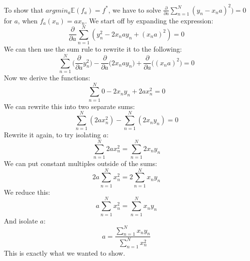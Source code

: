 To show that $argmin_a\mathbb{E}(f_a) = f^*$, we have to solve $\frac{\partial}{\partial a}\sum_{n=1}^N(y_n-x_na)^2)=0$ for $a$, when $f_a(x_n) = ax_n$. We start off by expanding the expression:
$$
\frac{\partial}{\partial a}\sum_{n=1}^N(y_n^2-2x_nay_n+(x_na)^2)=0
$$
We can then use the sum rule to rewrite it to the following:
$$
\sum_{n=1}^N\Big(\frac{\partial}{\partial a}y_n^2\Big) - \frac{\partial}{\partial a}\Big(2x_nay_n\Big)+\frac{\partial}{\partial a}\Big((x_na)^2\Big)=0
$$
Now we derive the functions:
$$
\sum_{n=1}^N0-2x_ny_n+2ax_n^2=0
$$
We can rewrite this into two separate sums:
$$
\sum_{n=1}^N (2ax_n^2) - \sum_{n=1}^N (2x_ny_n) = 0
$$
Rewrite it again, to try isolating $a$:
$$
\sum_{n=1}^N2ax_n^2 = \sum_{n=1}^N 2x_ny_n
$$
We can put constant multiples outside of the sums:
$$
2a\sum_{n=1}^Nx_n^2 = 2\sum_{n=1}^Nx_ny_n
$$
We reduce this:
$$
a\sum_{n=1}^Nx_n^2 = \sum_{n=1}^Nx_ny_n
$$
And isolate $a$:
$$
a=\frac{\sum_{n=1}^Nx_ny_n}{\sum_{n=1}^Nx_n^2}
$$
This is exactly what we wanted to show.